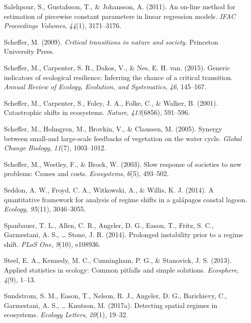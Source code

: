 \documentclass[12pt,twoside,openany]{reedthesis}
\begin{document}
\hypertarget{ref-salehpour2011line}{}
Salehpour, S., Gustafsson, T., \& Johansson, A. (2011). An on-line
method for estimation of piecewise constant parameters in linear
regression models. \emph{IFAC Proceedings Volumes}, \emph{44}(1),
3171--3176.

\hypertarget{ref-scheffer_critical_2009}{}
Scheffer, M. (2009). \emph{Critical transitions in nature and society}.
Princeton University Press.

\hypertarget{ref-scheffer2015generic}{}
Scheffer, M., Carpenter, S. R., Dakos, V., \& Nes, E. H. van. (2015).
Generic indicators of ecological resilience: Inferring the chance of a
critical transition. \emph{Annual Review of Ecology, Evolution, and
Systematics}, \emph{46}, 145--167.

\hypertarget{ref-scheffer_catastrophic_2001}{}
Scheffer, M., Carpenter, S., Foley, J. A., Folke, C., \& Walker, B.
(2001). Catastrophic shifts in ecosystems. \emph{Nature},
\emph{413}(6856), 591--596.

\hypertarget{ref-scheffer2005synergy}{}
Scheffer, M., Holmgren, M., Brovkin, V., \& Claussen, M. (2005). Synergy
between small-and large-scale feedbacks of vegetation on the water
cycle. \emph{Global Change Biology}, \emph{11}(7), 1003--1012.

\hypertarget{ref-scheffer2003slow}{}
Scheffer, M., Westley, F., \& Brock, W. (2003). Slow response of
societies to new problems: Causes and costs. \emph{Ecosystems},
\emph{6}(5), 493--502.

\hypertarget{ref-seddon2014quantitative}{}
Seddon, A. W., Froyd, C. A., Witkowski, A., \& Willis, K. J. (2014). A
quantitative framework for analysis of regime shifts in a galápagos
coastal lagoon. \emph{Ecology}, \emph{95}(11), 3046--3055.

\hypertarget{ref-spanbauer_prolonged_2014}{}
Spanbauer, T. L., Allen, C. R., Angeler, D. G., Eason, T., Fritz, S. C.,
Garmestani, A. S., \ldots{} Stone, J. R. (2014). Prolonged instability
prior to a regime shift. \emph{PLoS One}, \emph{9}(10), e108936.

\hypertarget{ref-steel2013applied}{}
Steel, E. A., Kennedy, M. C., Cunningham, P. G., \& Stanovick, J. S.
(2013). Applied statistics in ecology: Common pitfalls and simple
solutions. \emph{Ecosphere}, \emph{4}(9), 1--13.

\hypertarget{ref-sundstrom_detecting_2017}{}
Sundstrom, S. M., Eason, T., Nelson, R. J., Angeler, D. G., Barichievy,
C., Garmestani, A. S., \ldots{} Knutson, M. (2017a). Detecting spatial
regimes in ecosystems. \emph{Ecology Letters}, \emph{20}(1), 19--32.
\end{document}
